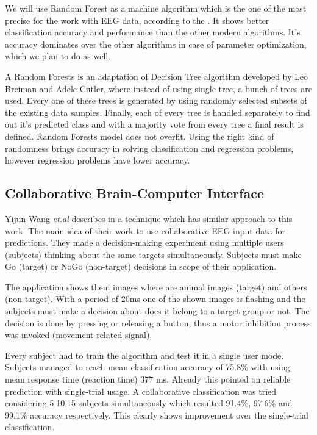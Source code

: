 \documentclass[12pt]{article}
\begin{document}
We will use Random Forest as a machine algorithm which is the one of the most precise for the work with EEG data, according to the \cite{masso}. It shows better classification accuracy and performance than the other modern algorithms. It's accuracy dominates over the other algorithms in case of parameter optimization, which we plan to do as well. 

A Random Forests is an adaptation of Decision Tree algorithm developed by Leo Breiman and Adele Cutler, where instead of using single tree, a bunch of trees are used. Every one of these trees is generated by using randomly selected subsets of the existing data samples. Finally, each of every tree is handled separately to find out it's predicted class and with a majority vote from every tree a final result is defined. Random Forests model does not overfit. Using the right kind of randomness brings accuracy in solving classification and regression problems, however regression problems have lower accuracy.\cite{breiman_rf}

\subsection{Collaborative Brain-Computer Interface}

Yijun Wang {\it et.al} describes in \cite{collaborative_wang} a technique which has similar approach to this work. The main idea of their work to use collaborative EEG input data for predictions. They made a decision-making experiment using multiple users (subjects) thinking about the same targets simultaneously. Subjects must make Go (target) or NoGo (non-target) decisions in scope of their application. 

The application shows them images where are animal images (target) and others (non-target). With a period of 20ms one of the shown images is flashing and the subjects must make a decision about does it belong to a target group or not. The decision is done by pressing or releasing a button, thus a motor inhibition process was invoked (movement-related signal). 

Every subject had to train the algorithm and test it in a single user mode. Subjects managed to reach mean classification accuracy of 75.8\% with using mean response time (reaction time) 377 ms. Already this pointed on reliable prediction with single-trial usage. A collaborative classification was tried considering 5,10,15 subjects simultaneously which resulted 91.4\%, 97.6\% and 99.1\% accuracy respectively. This clearly shows improvement over the single-trial classification. 
\end{document}
